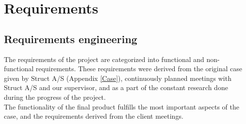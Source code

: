 
\chapter{Requirements} %

\label{Chapter3} %


\section{Requirements engineering}
The requirements of the project are categorized into functional and non-functional requirements. These requirements were derived from the original case given by Struct A/S (Appendix \ref{Case}), continuously planned meetings with Struct A/S and our supervisor, and as a part of the constant research done during the progress of the project. \\
The functionality of the final product fulfills the most important aspects of the case, and the requirements derived from the client meetings.

